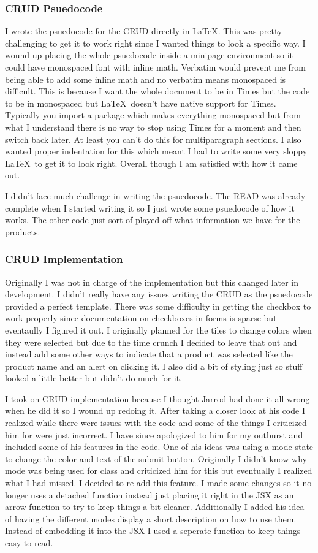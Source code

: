 \documentclass{article}[12pt]
\begin{document}
\subsubsection{CRUD Psuedocode}
I wrote the psuedocode for the CRUD directly in \LaTeX. This was pretty challenging to get it to work right since I wanted things to look a specific way. I wound up placing the whole psuedocode inside a minipage environment so it could have monospaced font with inline math. Verbatim would prevent me from being able to add some inline math and no verbatim means monospaced is difficult. This is because I want the whole document to be in Times but the code to be in monospaced but \LaTeX\ doesn't have native support for Times. Typically you import a package which makes everything monospaced but from what I understand there is no way to stop using Times for a moment and then switch back later. At least you can't do this for multiparagraph sections. I also wanted proper indentation for this which meant I had to write some very sloppy \LaTeX\ to get it to look right. Overall though I am satisfied with how it came out.

I didn't face much challenge in writing the psuedocode. The READ was already complete when I started writing it so I just wrote some psuedocode of how it works. The other code just sort of played off what information we have for the products.

\subsubsection{CRUD Implementation}
Originally I was not in charge of the implementation but this changed later in development. I didn't really have any issues writing the CRUD as the psuedocode provided a perfect template. There was some difficulty in getting the checkbox to work properly since documentation on checkboxes in forms is sparse but eventaully I figured it out. I originally planned for the tiles to change colors when they were selected but due to the time crunch I decided to leave that out and instead add some other ways to indicate that a product was selected like the product name and an alert on clicking it. I also did a bit of styling just so stuff looked a little better but didn't do much for it.

I took on CRUD implementation because I thought Jarrod had done it all wrong when he did it so I wound up redoing it. After taking a closer look at his code I realized while there were issues with the code and some of the things I criticized him for were just incorrect. I have since apologized to him for my outburst and included some of his features in the code. One of his ideas was using a mode state to change the color and text of the submit button. Originally I didn't know why mode was being used for class and criticized him for this but eventually I realized what I had missed. I decided to re-add this feature. I made some changes so it no longer uses a detached function instead just placing it right in the JSX as an arrow function to try to keep things a bit cleaner. Additionally I added his idea of having the different modes display a short description on how to use them. Instead of embedding it into the JSX I used a seperate function to keep things easy to read.
\end{document}
